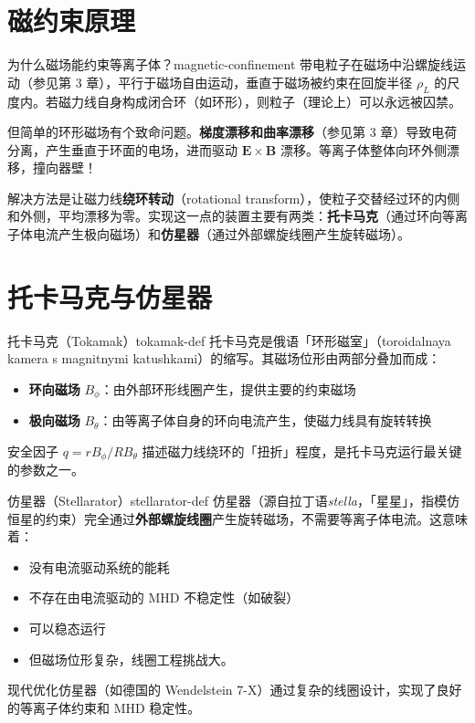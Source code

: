 \documentclass[12pt,a4paper,openany,oneside]{book}
\newcommand{\diffmarktext}[1]{%
  \textcolor{coverMid!80}{\rule[-0.1em]{2pt}{0.9em}}\,%
  \textcolor{coverMid}{\footnotesize\textbf{[#1]}}%
}
\newcommand{\difficulty}[1]{\marginnote{\raggedright\diffmarktext{#1}}}
\newcommand{\vect}[1]{\bm{#1}}
\begin{document}
\section{磁约束原理}\difficulty{基础}
\label{sec:ch10-confinement}

\begin{insight}{为什么磁场能约束等离子体？}{magnetic-confinement}
带电粒子在磁场中沿螺旋线运动（参见第 3 章），平行于磁场自由运动，垂直于磁场被约束在回旋半径 $\rho_L$ 的尺度内。若磁力线自身构成闭合环（如环形），则粒子（理论上）可以永远被囚禁。

但简单的环形磁场有个致命问题。\textbf{梯度漂移和曲率漂移}（参见第 3 章）导致电荷分离，产生垂直于环面的电场，进而驱动 $\vect{E}\times\vect{B}$ 漂移。等离子体整体向环外侧漂移，撞向器壁！

解决方法是让磁力线\textbf{绕环转动}（rotational transform），使粒子交替经过环的内侧和外侧，平均漂移为零。实现这一点的装置主要有两类：\textbf{托卡马克}（通过环向等离子体电流产生极向磁场）和\textbf{仿星器}（通过外部螺旋线圈产生旋转磁场）。
\end{insight}

\section{托卡马克与仿星器}\difficulty{基础}
\label{sec:ch10-tokamak}

\begin{definition}{托卡马克（Tokamak）}{tokamak-def}
托卡马克是俄语「环形磁室」（toroidalnaya kamera s magnitnymi katushkami）的缩写。其磁场位形由两部分叠加而成：
\begin{itemize}
\item \textbf{环向磁场} $B_\phi$：由外部环形线圈产生，提供主要的约束磁场
\item \textbf{极向磁场} $B_\theta$：由等离子体自身的环向电流产生，使磁力线具有旋转转换
\end{itemize}
安全因子 $q = rB_\phi/RB_\theta$ 描述磁力线绕环的「扭折」程度，是托卡马克运行最关键的参数之一。
\end{definition}

\begin{definition}{仿星器（Stellarator）}{stellarator-def}
仿星器（源自拉丁语\textit{stella}，「星星」，指模仿恒星的约束）完全通过\textbf{外部螺旋线圈}产生旋转磁场，不需要等离子体电流。这意味着：
\begin{itemize}
\item 没有电流驱动系统的能耗
\item 不存在由电流驱动的 MHD 不稳定性（如破裂）
\item 可以稳态运行
\item 但磁场位形复杂，线圈工程挑战大。
\end{itemize}
现代优化仿星器（如德国的 Wendelstein 7-X）通过复杂的线圈设计，实现了良好的等离子体约束和 MHD 稳定性。
\end{definition}
\end{document}
